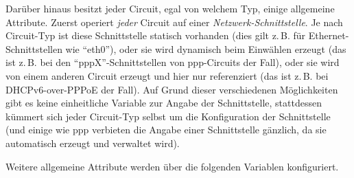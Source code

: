 Darüber hinaus besitzt jeder Circuit, egal von welchem Typ, einige allgemeine
Attribute. Zuerst operiert \emph{jeder} Circuit auf einer
\emph{Netzwerk-Schnittstelle}. Je nach Circuit-Typ ist diese Schnittstelle
statisch vorhanden (dies gilt z.\,B. für Ethernet-Schnittstellen wie ``eth0''),
oder sie wird dynamisch beim Einwählen erzeugt (das ist z.\,B. bei den
``pppX''-Schnittstellen von ppp-Circuits der Fall), oder sie wird von einem
anderen Circuit erzeugt und hier nur referenziert (das ist z.\,B. bei
DHCPv6-over-PPPoE der Fall). Auf Grund dieser verschiedenen
Möglichkeiten gibt es keine einheitliche Variable zur Angabe der Schnittstelle,
stattdessen kümmert sich jeder Circuit-Typ selbst um die Konfiguration der
Schnittstelle (und einige wie ppp verbieten die Angabe einer Schnittstelle
gänzlich, da sie automatisch erzeugt und verwaltet wird).

Weitere allgemeine Attribute werden über die folgenden Variablen konfiguriert.

